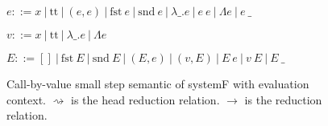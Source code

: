 \newcommand{\hstep}{\rightsquigarrow}
\newcommand{\step}{\rightarrow}
\begin{figure}[ht]
  $e ::= x\ |\ \mathrm{tt}\
  |\ (e,e)\
  |\ \mathrm{fst}\ e\
  |\ \mathrm{snd}\ e\
  |\ \lambda \_. e\
  |\ e\ e\
  |\ \Lambda e\
  |\ e\ \_
  $

  $v ::= x\ |\ \mathrm{tt}\ |\ \lambda \_. e\ |\ \Lambda e$

  $E ::= []\
  |\ \ E\
  |\ \mathrm{snd}\ E\
  |\ (E, e)\
  |\ (v, E)\
  |\ E\ e\
  |\ v\ E\
  |\ E\ \_
  $

  \centering
  \caption{\label{fig:opsemSF} Call-by-value small step semantic of systemF with
    evaluation context. $\hstep$ is the head reduction relation. $\step$ is
    the reduction relation.}
\end{figure}
